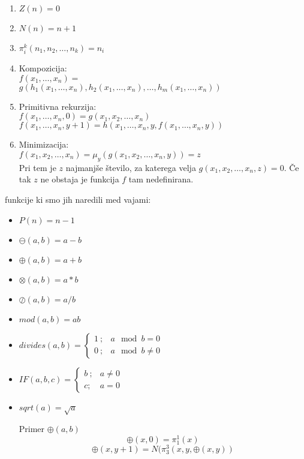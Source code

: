 \documentclass[a4paper]{article}
\begin{document}
\begin{multicols}{2}
\begin{enumerate}
\item $Z(n)=0$
\item $N(n)=n+1$
\item $\pi^k_i (n_1, n_2, \dots, n_k)=n_i$
\item Kompozicija: \\
	$ f(x_1, \dots, x_n) = $ \\ $ g(h_1(x_1, \dots, x_n), h_2(x_1,\dots, x_n), \dots, h_m(x_1, \dots, x_n)) $ 
\item Primitivna rekurzija: \\
	$ f(x_1, \dots, x_n, 0) = g(x_1, x_2, \dots, x_n) $ \\
	$ f(x_1, \dots, x_n, y+1) = h(x_1, \dots, x_n, y, f(x_1, \dots, x_n, y)) $
\item Minimizacija: \\
	$ f(x_1, x_2, \dots, x_n) = \mu_y (g(x_1, x_2, \dots, x_n, y)) = z $ \\
	Pri tem je $z$ najmanjše število, za katerega velja $g(x_1, x_2, \dots, x_n, z) = 0$. Če tak $z$ ne obstaja je funkcija $f$ tam nedefinirana.
\end{enumerate}
funkcije ki smo jih naredili med vajami:
\begin{itemize}
\item $P(n) = n-1$
\item $\ominus(a,b) = a-b$
\item $\oplus(a,b) = a+b$
\item $\otimes(a,b) = a*b$
\item $\oslash(a,b) = a/b$
\item $mod(a,b) = ab$
\item $divides(a,b) = \begin{cases} 1 \ ; & a \mod b = 0 \\ 0 \ ; & a \mod b \neq 0 \end{cases}$
\item $IF(a,b,c) = \begin{cases} b \ ; & a \neq 0 \\ c ; & a = 0 \end{cases}$
\item $sqrt(a) = \sqrt{a} $

Primer $ \oplus (a,b) $\\
\[ \oplus(x,0) = \pi^1_1(x) \]
\[ \oplus(x,y+1) = N(\pi^3_3(x,y,\oplus(x,y)) \]

\end{itemize}

\end{multicols}
\end{document}
